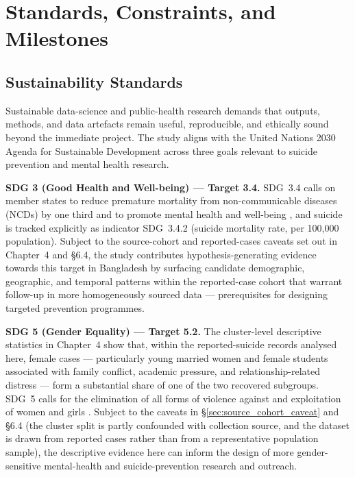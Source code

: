 \chapter{Standards, Constraints, and Milestones}

\section{Sustainability Standards}

Sustainable data-science and public-health research demands that outputs, methods, and data artefacts remain useful, reproducible, and ethically sound beyond the immediate project. The study aligns with the United Nations 2030 Agenda for Sustainable Development \cite{ref24} across three goals relevant to suicide prevention and mental health research.

\textbf{SDG 3 (Good Health and Well-being) --- Target 3.4.} SDG~3.4 calls on member states to reduce premature mortality from non-communicable diseases (NCDs) by one third and to promote mental health and well-being \cite{ref25}, and suicide is tracked explicitly as indicator SDG~3.4.2 (suicide mortality rate, per 100,000 population). Subject to the source-cohort and reported-cases caveats set out in Chapter~4 and \S6.4, the study contributes hypothesis-generating evidence towards this target in Bangladesh by surfacing candidate demographic, geographic, and temporal patterns within the reported-case cohort that warrant follow-up in more homogeneously sourced data --- prerequisites for designing targeted prevention programmes.

\textbf{SDG 5 (Gender Equality) --- Target 5.2.} The cluster-level descriptive statistics in Chapter~4 show that, within the reported-suicide records analysed here, female cases --- particularly young married women and female students associated with family conflict, academic pressure, and relationship-related distress --- form a substantial share of one of the two recovered subgroups. SDG~5 calls for the elimination of all forms of violence against and exploitation of women and girls \cite{ref24}. Subject to the caveats in \S\ref{sec:source_cohort_caveat} and \S6.4 (the cluster split is partly confounded with collection source, and the dataset is drawn from reported cases rather than from a representative population sample), the descriptive evidence here can inform the design of more gender-sensitive mental-health and suicide-prevention research and outreach.

